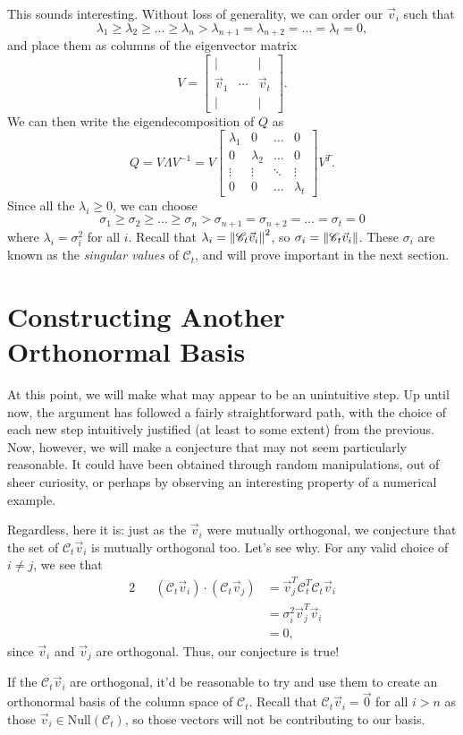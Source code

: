 \documentclass[letterpaper]{article}
\theoremstyle{remark}
\newcommand{\Null}[1]{\text{Null}(#1)}
\newcommand{\mat}[1]{\ensuremath{\begin{bmatrix}#1\end{bmatrix}}}
\newcommand{\eqn}[1]{\begin{alignat*}{2}#1\end{alignat*}}
\begin{document}
This sounds interesting. Without loss of generality, we can order our $\vec{v}_i$ such that
\[
    \lambda_1 \ge \lambda_2 \ge \ldots \ge \lambda_n > \lambda_{n + 1} = \lambda_{n + 2} = \ldots = \lambda_t = 0,
\]
and place them as columns of the eigenvector matrix
\[
    V = \mat{| & & | \\ \vec{v}_1 & \cdots & \vec{v}_t \\ | & & |}.
\]
We can then write the eigendecomposition of $Q$ as
\[
    Q = V\Lambda V^{-1} = V\mat{\lambda_1 & 0 & \ldots &  0 \\ 0 & \lambda_2 & \ldots & 0 \\ \vdots & \vdots & \ddots & \vdots \\ 0 & 0 & \ldots & \lambda_t}V^T.
\]
Since all the $\lambda_i \ge 0$, we can choose
\[
    \sigma_1 \ge \sigma_2 \ge \ldots \ge \sigma_n > \sigma_{n + 1} = \sigma_{n + 2} = \ldots = \sigma_t = 0
\]
where $\lambda_i = \sigma_i^2$ for all $i$. Recall that $\lambda_i = \norm{\mathscr{C}_t\vec{v}_i}^2$, so $\sigma_i = \norm{\mathscr{C}_t\vec{v}_i}$. These $\sigma_i$ are known as the \emph{singular values} of $\mathscr{C}_t$, and will prove important in the next section.

\section{Constructing Another Orthonormal Basis}
At this point, we will make what may appear to be an unintuitive step. Up until now, the argument has followed a fairly straightforward path, with the choice of each new step intuitively justified (at least to some extent) from the previous. Now, however, we will make a conjecture that may not seem particularly reasonable. It could have been obtained through random manipulations, out of sheer curiosity, or perhaps by observing an interesting property of a numerical example.

Regardless, here it is: just as the $\vec{v}_i$ were mutually orthogonal, we conjecture that the set of $\mathscr{C}_t\vec{v}_i$ is mutually orthogonal too. Let's see why. For any valid choice of $i \ne j$, we see that
\eqn{
    && (\mathscr{C}_t\vec{v}_i) \cdot (\mathscr{C}_t\vec{v}_j) &= \vec{v}_j^T\mathscr{C}_t^T\mathscr{C}_t\vec{v}_i \\
    &&&= \sigma_i^2 \vec{v}_j^T\vec{v}_i \\
    &&&= 0,
}
since $\vec{v}_i$ and $\vec{v}_j$ are orthogonal. Thus, our conjecture is true!

If the $\mathscr{C}_t\vec{v}_i$ are orthogonal, it'd be reasonable to try and use them to create an orthonormal basis of the column space of $\mathscr{C}_t$. Recall that $\mathscr{C}_t\vec{v}_i = \vec{0}$ for all $i > n$ as those $\vec{v}_i \in \Null{\mathscr{C}_t}$, so those vectors will not be contributing to our basis. 
\end{document}
